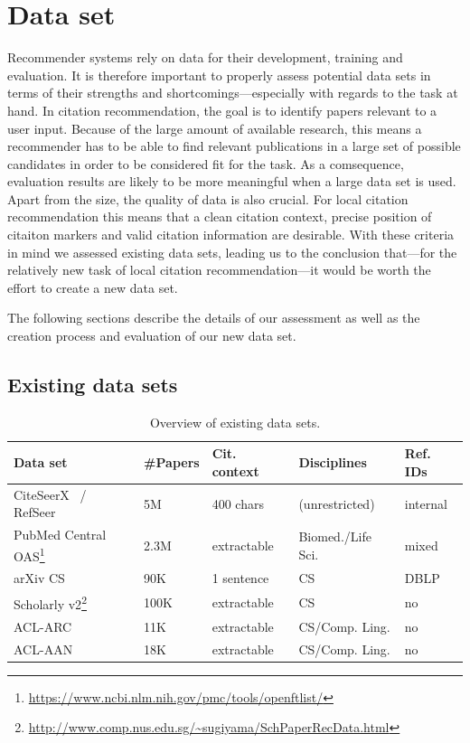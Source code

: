 \chapter{Data set}\label{chap:dataset}
Recommender systems rely on data for their development, training and evaluation. It is therefore important to properly assess potential data sets in terms of their strengths and shortcomings---especially with regards to the task at hand. In citation recommendation, the goal is to identify papers relevant to a user input. Because of the large amount of available research, this means a recommender has to be able to find relevant publications in a large set of possible candidates in order to be considered fit for the task. As a comsequence, evaluation results are likely to be more meaningful when a large data set is used. Apart from the size, the quality of data is also crucial. For local citation recommendation this means that a clean citation context, precise position of citaiton markers and valid citation information are desirable. With these criteria in mind we assessed existing data sets, leading us to the conclusion that---for the relatively new task of local citation recommendation---it would be worth the effort to create a new data set.

The following sections describe the details of our assessment as well as the creation process and evaluation of our new data set.

\section{Existing data sets}

\begin{table}
\centering
    \caption{Overview of existing data sets.}
    \label{tab:datasets}
\begin{center}
    \begin{tabular}{lllll}
    \toprule
    Data set & \#Papers & Cit. context & Disciplines & Ref. IDs \\
    \midrule
    CiteSeerX~\cite{Caragea2014} / RefSeer~\cite{Huang2014} & 5M & 400 chars & (unrestricted) & internal \\
    PubMed Central OAS\footnote{\url{https://www.ncbi.nlm.nih.gov/pmc/tools/openftlist/}} & 2.3M & extractable & Biomed./Life Sci. & mixed \\
    arXiv CS~\cite{Faerber2018} &  90K & 1 sentence & CS & DBLP \\
    Scholarly v2\footnote{\url{http://www.comp.nus.edu.sg/~sugiyama/SchPaperRecData.html}}  & 100K & extractable & CS & no \\
    ACL-ARC  & 11K & extractable & CS/Comp. Ling. & no \\ %
    ACL-AAN  & 18K & extractable & CS/Comp. Ling. & no  \\ %
    \bottomrule
    \end{tabular}
\end{center}
\end{table}

